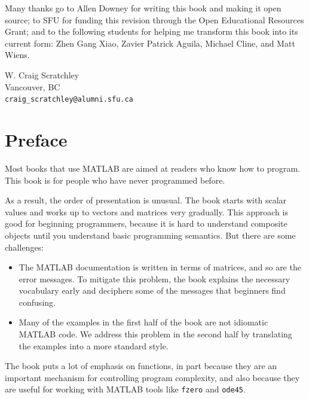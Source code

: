 \documentclass[
]{book}
\numberwithin{Answer}{chapter}
\numberwithin{Exercise}{chapter}
\begin{document}
Many thanks go to Allen Downey for writing this book and making it open
source; to SFU for funding this revision through the Open Educational
Resources Grant; and to the following students for helping me transform
this book into its current form: Zhen Gang Xiao, Zavier Patrick Aguila,
Michael Cline, and Matt Wiens.

\noindent W. Craig Scratchley
\\
\noindent Vancouver, BC
\\
{\tt craig\_scratchley@alumni.sfu.ca}

\newpage

\chapter{Preface}


Most books that use MATLAB are aimed at readers who know how
to program.  This book is for people who have never programmed
before.

As a result, the order of presentation is unusual.  The book starts
with scalar values and works up to vectors and matrices very
gradually.  This approach is good for beginning programmers, because
it is hard to understand composite objects until you understand basic
programming semantics.  But there are some challenges:

\begin{itemize}

\item The MATLAB documentation is written in terms of matrices,
and so are the error messages.
To mitigate this problem, the book explains the necessary
vocabulary early and deciphers some of the messages that
beginners find confusing.

\item Many of the examples in the first half of the book are
not idiomatic MATLAB code.  We address this problem in the second
half by translating the examples into a more standard style.

\end{itemize}

The book puts a lot of emphasis on functions, in part because they are
an important mechanism for controlling program complexity, and also
because they are useful for working with MATLAB tools like {\tt fzero}
and {\tt ode45}.
\end{document}
